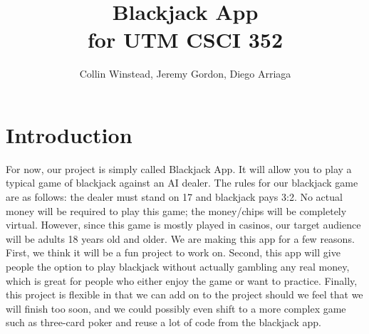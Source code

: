 \documentclass[10pt,conference,onecolumn,compsoc]{IEEEtran}
\begin{document}
\title{Blackjack App\\ for UTM CSCI 352}
%
%


\author{Collin Winstead, Jeremy Gordon, Diego Arriaga%
}



\maketitle



\IEEEdisplaynontitleabstractindextext

\IEEEpeerreviewmaketitle



\section{Introduction}


For now, our project is simply called Blackjack App. It will allow you to play a typical game of blackjack against an AI dealer. The rules for our blackjack game are as follows: the dealer must stand on 17 and blackjack pays 3:2. No actual money will be required to play this game; the money/chips will be completely virtual. However, since this game is mostly played in casinos, our target audience will be adults 18 years old and older. We are making this app for a few reasons. First, we think it will be a fun project to work on. Second, this app will give people the option to play blackjack without actually gambling any real money, which is great for people who either enjoy the game or want to practice. Finally, this project is flexible in that we can add on to the project should we feel that we will finish too soon, and we could possibly even shift to a more complex game such as three-card poker and reuse a lot of code from the blackjack app.
\end{document}
